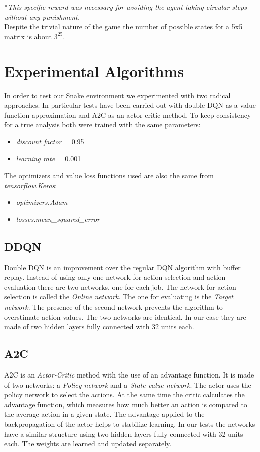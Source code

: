 \documentclass[conference]{IEEEtran}
\begin{document}
*\textit{This specific reward was necessary for avoiding the agent taking circular steps without any punishment.} \\
Despite the trivial nature of the game the number of possible states for a 5x5 matrix is about $3^{25}$.

\section{Experimental Algorithms}
In order to test our Snake environment we experimented with two radical approaches. In particular tests have been carried out with double DQN
as a value function approximation and A2C as an actor-critic method. To keep consistency for a true analysis both were trained with the same parameters:
\begin{itemize}
    \item \textit{discount factor} = 0.95
    \item \textit{learning rate} = 0.001
\end{itemize}
The optimizers and value loss functions used are also the same from \textit{tensorflow.Keras}:
\begin{itemize}
    \item \textit{optimizers.Adam}
    \item \textit{losses.mean\_squared\_error}
\end{itemize}

\subsection{DDQN}
Double DQN\cite{b1} is an improvement over the regular DQN algorithm with buffer replay. Instead of using only one network for action selection and action evaluation
there are two networks, one for each job. The network for action selection is called the \textit{Online network}. The one for evaluating is the \textit{Target network}.
The presence of the second network prevents the algorithm to overstimate action values. The two networks are identical.
In our case they are made of two hidden layers fully connected with 32 units each.

\subsection{A2C}
A2C is an \textit{Actor-Critic} method \cite{b2} with the use of an advantage function. It is made of two networks: a \textit{Policy network} and a \textit{State-value network}.
The actor uses the policy network to select the actions. At the same time the critic calculates the advantage function, which
measures how much better an action is compared to the average action in a given state.
The advantage applied to the backpropagation of the actor helps to stabilize learning.
In our tests the networks have a similar structure using two hidden layers fully connected with 32 units each. The weights are learned and updated separately.
\end{document}
